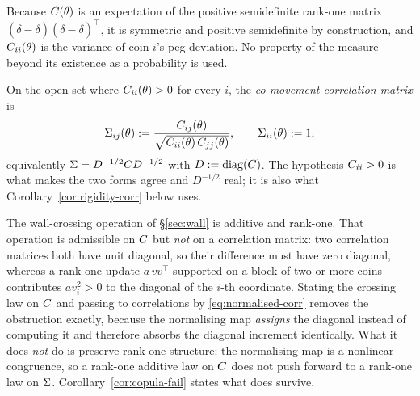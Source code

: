 Because $C(\theta)$ is an expectation of the positive semidefinite rank-one matrix $(\delta-\bar\delta)(\delta-\bar\delta)^\top$, it is symmetric and positive semidefinite by construction, and $C_{ii}(\theta)$ is the variance of coin $i$'s peg deviation. No property of the measure beyond its existence as a probability is used.

\begin{definition}\label{def:corr}
On the open set where $C_{ii}(\theta) > 0$ for every $i$, the \emph{co-movement correlation matrix} is
\begin{equation}\label{eq:normalised-corr}
\Sigma_{ij}(\theta) := \frac{C_{ij}(\theta)}{\sqrt{C_{ii}(\theta)\,C_{jj}(\theta)}},\qquad \Sigma_{ii}(\theta) := 1,
\end{equation}
equivalently $\Sigma = D^{-1/2}C D^{-1/2}$ with $D := \operatorname{diag}(C)$. The hypothesis $C_{ii}>0$ is what makes the two forms agree and $D^{-1/2}$ real; it is also what Corollary~\ref{cor:rigidity-corr} below uses.
\end{definition}

\begin{remark}\label{rem:why-cov}
The wall-crossing operation of \S\ref{sec:wall} is additive and rank-one. That operation is admissible on $C$ but \emph{not} on a correlation matrix: two correlation matrices both have unit diagonal, so their difference must have zero diagonal, whereas a rank-one update $a\,v v^\top$ supported on a block of two or more coins contributes $a v_i^2 > 0$ to the diagonal of the $i$-th coordinate. Stating the crossing law on $C$ and passing to correlations by \eqref{eq:normalised-corr} removes the obstruction exactly, because the normalising map \emph{assigns} the diagonal instead of computing it and therefore absorbs the diagonal increment identically. What it does \emph{not} do is preserve rank-one structure: the normalising map is a nonlinear congruence, so a rank-one additive law on $C$ does not push forward to a rank-one law on $\Sigma$. Corollary~\ref{cor:copula-fail} states what does survive.
\end{remark}

